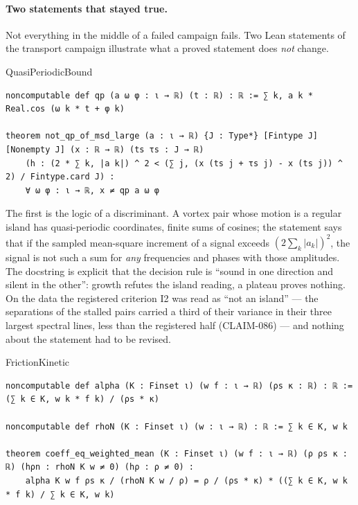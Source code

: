 \paragraph{Two statements that stayed true.} Not everything in the middle of a failed campaign fails. Two Lean statements of the transport campaign
illustrate what a proved statement does \emph{not} change.

\begin{leanbox}{QuasiPeriodicBound}
\begin{lstlisting}[style=lean]
noncomputable def qp (a ω φ : ι → ℝ) (t : ℝ) : ℝ := ∑ k, a k * Real.cos (ω k * t + φ k)

theorem not_qp_of_msd_large (a : ι → ℝ) {J : Type*} [Fintype J] [Nonempty J] (x : ℝ → ℝ) (ts τs : J → ℝ)
    (h : (2 * ∑ k, |a k|) ^ 2 < (∑ j, (x (ts j + τs j) - x (ts j)) ^ 2) / Fintype.card J) :
    ∀ ω φ : ι → ℝ, x ≠ qp a ω φ
\end{lstlisting}
\end{leanbox}

\noindent The first is the logic of a discriminant. A vortex pair whose motion is a regular island has quasi-periodic coordinates, finite sums of cosines;
the statement says that if the sampled mean-square increment of a signal exceeds $(2\sum_k|a_k|)^2$, the signal is not such a sum for \emph{any}
frequencies and phases with those amplitudes. The docstring is explicit that the decision rule is ``sound in one direction and silent in the other'': growth
refutes the island reading, a plateau proves nothing. On the data the registered criterion I2 was read as ``not an island'' --- the separations of the
stalled pairs carried a third of their variance in their three largest spectral lines, less than the registered half (CLAIM-086) --- and nothing about the
statement had to be revised.

\begin{leanbox}{FrictionKinetic}
\begin{lstlisting}[style=lean]
noncomputable def alpha (K : Finset ι) (w f : ι → ℝ) (ρs κ : ℝ) : ℝ := (∑ k ∈ K, w k * f k) / (ρs * κ)

noncomputable def rhoN (K : Finset ι) (w : ι → ℝ) : ℝ := ∑ k ∈ K, w k

theorem coeff_eq_weighted_mean (K : Finset ι) (w f : ι → ℝ) (ρ ρs κ : ℝ) (hρn : rhoN K w ≠ 0) (hρ : ρ ≠ 0) :
    alpha K w f ρs κ / (rhoN K w / ρ) = ρ / (ρs * κ) * ((∑ k ∈ K, w k * f k) / ∑ k ∈ K, w k)
\end{lstlisting}
\end{leanbox}

